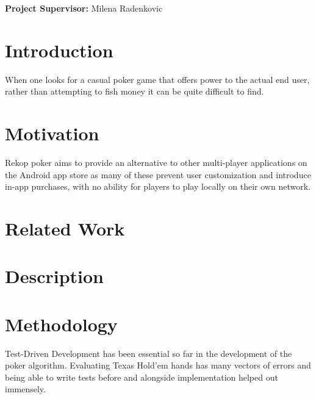 \documentclass[11pt]{article}
\begin{document}
\vfill

\begin{center}
	\textbf{Project Supervisor:} Milena Radenkovic
\end{center}

\hspace{0pt}

\pagebreak


\newcommand{\entry}[1]{
	\textbf{#1} - 
}

\newcommand{\TODO}[1]{
	\textbf{{\Large \emph{#1}}}
}




\section*{Introduction}

When one looks for a casual poker game that offers power to the actual end user, rather than attempting to fish money it can be quite difficult to find. 



\section*{Motivation}
Rekop poker aims to provide an alternative to other multi-player applications on the Android app store as many of these prevent user customization and introduce in-app purchases, with no ability for players to play locally on their own network. 




\section*{Related Work}




\section*{Description}



\section*{Methodology}

Test-Driven Development has been essential so far in the development of the poker algorithm. Evaluating Texas Hold'em hands has many vectors of errors and being able to write tests before and alongside implementation helped out immensely. 
\end{document}

